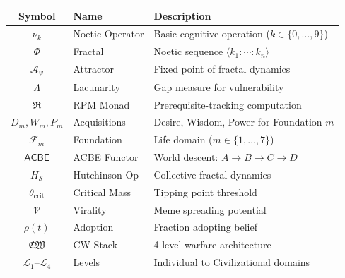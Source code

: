 \documentclass[11pt,twoside]{book}
\renewcommand{\arraystretch}{1.2}
\theoremstyle{definition}
\theoremstyle{plain}
\theoremstyle{remark}
\newcommand{\Foundations}{\mathcal{F}}
\newcommand{\noe}[1]{\nu_{#1}}
\newcommand{\Frac}{\Phi}
\newcommand{\RPM}{\mathfrak{R}}
\newcommand{\ACBE}{\mathsf{ACBE}}
\newcommand{\PsychAttractor}{\mathcal{A}_\psi}
\newcommand{\Lacunarity}{\Lambda}
\newcommand{\CogWarStack}{\mathfrak{CW}}
\newcommand{\LevelI}{\mathcal{L}_1}
\newcommand{\LevelIV}{\mathcal{L}_4}
\begin{document}
\begin{center}
\renewcommand{\arraystretch}{1.2}
\begin{tabularx}{\textwidth}{c|l|X}
\toprule
\textbf{Symbol} & \textbf{Name} & \textbf{Description} \\
\midrule
$\noe{k}$ & Noetic Operator & Basic cognitive operation ($k \in \{0,\ldots,9\}$) \\
$\Frac$ & Fractal & Noetic sequence $\langle k_1:\cdots:k_n \rangle$ \\
$\PsychAttractor$ & Attractor & Fixed point of fractal dynamics \\
$\Lacunarity$ & Lacunarity & Gap measure for vulnerability \\
$\RPM$ & RPM Monad & Prerequisite-tracking computation \\
$D_m, W_m, P_m$ & Acquisitions & Desire, Wisdom, Power for Foundation $m$ \\
$\Foundations_m$ & Foundation & Life domain ($m \in \{1,\ldots,7\}$) \\
$\ACBE$ & ACBE Functor & World descent: $A \to B \to C \to D$ \\
$H_{\mathcal{S}}$ & Hutchinson Op & Collective fractal dynamics \\
$\theta_{\mathrm{crit}}$ & Critical Mass & Tipping point threshold \\
$\mathcal{V}$ & Virality & Meme spreading potential \\
$\rho(t)$ & Adoption & Fraction adopting belief \\
$\CogWarStack$ & CW Stack & 4-level warfare architecture \\
$\LevelI$--$\LevelIV$ & Levels & Individual to Civilizational domains \\
\bottomrule
\end{tabularx}
\end{center}

\end{document}
